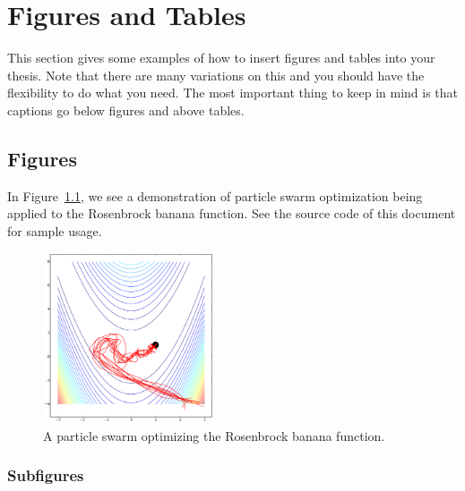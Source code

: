 \documentclass[master]{thesis}
\newcommand{\fref}[1]{Figure~\ref{#1}}   %
\begin{document}
\chapter{Figures and Tables}
\label{chap:figures.and.tables}

This section gives some examples of how to insert figures and tables into your thesis.  Note that there are many variations on this and you should have the flexibility to do what you need.  The most important thing to keep in mind is that captions go below figures and above tables.

\section{Figures}

In \fref{fig:pso}, we see a demonstration of particle swarm optimization being applied to the Rosenbrock banana function.  See the source code of this document for sample usage.

\begin{figure}[htp]
    \includegraphics[width=0.45\textwidth]{pso}

    \caption[Particle swarm optimization.]{A particle swarm optimizing the Rosenbrock banana function.}

    \label{fig:pso}
\end{figure}

\subsection{Subfigures}
\end{document}
